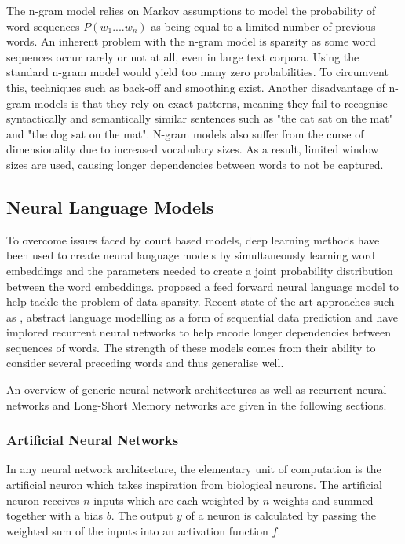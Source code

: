 \noindent
\newline
The n-gram model relies on Markov assumptions to model the probability of word sequences \(P(w_{1}....w_{n}) \) as being equal to a limited number of previous words. An inherent problem with the n-gram model is sparsity as some word sequences occur rarely or not at all, even in large text corpora. Using the standard n-gram model would yield too many zero probabilities. To circumvent this, techniques such as back-off and smoothing exist. Another disadvantage of n-gram models is that they rely on exact patterns, meaning they fail to recognise syntactically and semantically similar sentences such as "the cat sat on the mat" and "the dog sat on the mat". N-gram models also suffer from the curse of dimensionality due to increased vocabulary sizes. As a result, limited window sizes are used, causing longer dependencies between words to not be captured.

\subsection{Neural Language Models}
To overcome issues faced by count based models, deep learning methods have been used to create neural language models by simultaneously learning word embeddings and the parameters needed to create a joint probability distribution between the word embeddings. \cite{Bengio2003} proposed a feed forward neural language model to help tackle the problem of data sparsity. Recent state of the art approaches such as \cite{Mikolov2010}, abstract language modelling as a form of sequential data prediction and have implored recurrent neural networks to help encode longer dependencies between sequences of words. The strength of these models comes from their ability to consider several preceding words and thus generalise well.

\noindent
\newline
An overview of generic neural network architectures as well as recurrent neural networks and Long-Short Memory networks are given in the following sections.

\subsubsection{Artificial Neural Networks}
In any neural network architecture, the elementary unit of computation is the artificial neuron which takes inspiration from biological neurons. The artificial neuron receives \(n\) inputs which are each weighted by \(n\) weights and summed together with a bias \(b\). The output \(y\) of a neuron is calculated by passing the weighted sum of the inputs into an activation function \(f\). 


